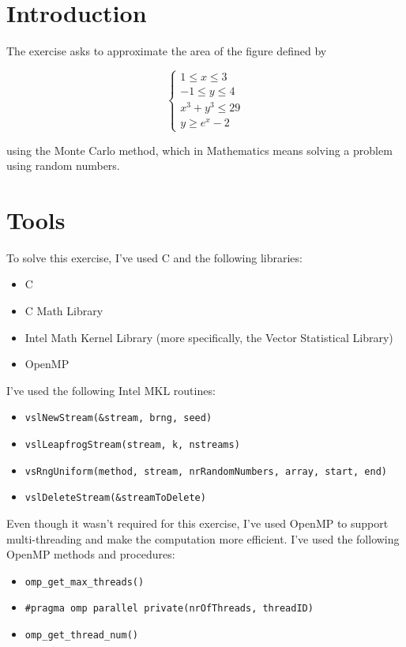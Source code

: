 \documentclass{article}
\newcommand{\code}{\texttt}
\begin{document}
\section{Introduction}\label{sec:intro}
The exercise asks to approximate the area of the figure defined by

$$
\begin{cases}
1 \le x \le 3 \\
-1\le y \le 4 \\  
x^3+y^3\le 29 \\
y \ge e^x -2
\end{cases}$$

using the Monte Carlo method, which in Mathematics means solving a problem using random numbers.

\section{Tools}
To solve this exercise, I've used C and the following libraries:

\begin{itemize}
  \item C
  \item C Math Library
  \item Intel Math Kernel Library (more specifically, the Vector Statistical Library)
  \item OpenMP
\end{itemize}

I've used the following Intel MKL routines:
\begin{itemize}
  \item \code{vslNewStream(\&stream, brng, seed)}
  \item \code{vslLeapfrogStream(stream, k, nstreams)}
  \item \code{vsRngUniform(method, stream, nrRandomNumbers, array, start, end)}
  \item \code{vslDeleteStream(\&streamToDelete)}
\end{itemize}

Even though it wasn't required for this exercise, I've used OpenMP to support multi-threading and make the computation more efficient. I've used the following OpenMP methods and procedures:
\begin{itemize}
  \item \code{omp\_get\_max\_threads()}
  \item \code{\#pragma omp parallel private(nrOfThreads, threadID)}
  \item \code{omp\_get\_thread\_num()}
\end{itemize}
\end{document}
